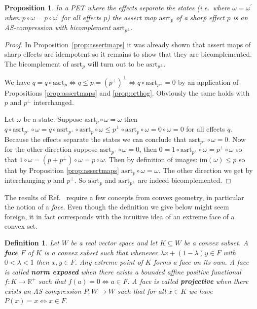 \documentclass[b5paper,onecolumn,12pt,accepted=2019-05-03, issue=1, volume=1, shorttitle=papers/compositionality-1-1]{compositionalityarticle}
\newcounter{counter}
\numberwithin{counter}{section}
\newtheorem{proposition}[counter]{Proposition}
\newtheorem{definition}[counter]{Definition}
\newcommand{\R}{\mathbb{R}}
\newcommand{\asrt}{\text{asrt}}
\newcommand{\im}[1]{\text{im}(#1)}
\begin{document}
\begin{proposition}\label{prop:gencompr}
    In a PET where the effects separate the states (i.e.\ where $\omega=\omega^\prime$ when $p\circ \omega = p\circ \omega^\prime$ for all effects $p$) the assert map $\asrt_p$ of a sharp effect $p$ is an AS-compression with bicomplement $\asrt_{p^\perp}$.
\end{proposition}
\begin{proof}
    In Proposition~\ref{prop:assertmaps} it was already shown that assert maps of sharp effects are idempotent so it remains to show that they are bicomplemented. The bicomplement of $\asrt_p$ will turn out to be $\asrt_{p^\perp}$.

    We have $q=q\circ \asrt_p \iff q\leq p=(p^\perp)^\perp \iff q\circ \asrt_{p^\perp}=0$ by an application of Propositions \ref{prop:assertmaps} and \ref{prop:orthog}. Obviously the same holds with $p$ and $p^\perp$ interchanged.

    Let $\omega$ be a state. Suppose $\asrt_p\circ \omega = \omega$ then $q\circ \asrt_{p^\perp}\circ \omega = q\circ\asrt_{p^\perp}\circ \asrt_p\circ\omega \leq p^\perp\circ \asrt_p\circ \omega = 0\circ\omega = 0$ for all effects $q$. Because the effects separate the states we can conclude that $\asrt_{p^\perp}\circ \omega = 0$. Now for the other direction suppose $\asrt_{p^\perp}\circ \omega = 0$, then $0=1\circ \asrt_{p^\perp}\circ \omega = p^\perp\circ \omega$ so that $1\circ \omega = (p+p^\perp)\circ \omega = p\circ \omega$. Then by definition of images: $\im{\omega}\leq p$ so that by Proposition \ref{prop:assertmaps} $\asrt_p\circ \omega = \omega$. The other direction we get by interchanging $p$ and $p^\perp$. So $\asrt_p$ and $\asrt_{p^\perp}$ are indeed bicomplemented.
\end{proof}

The results of Ref.~\cite{alfsen2012geometry} require a few concepts from convex geometry, in particular the notion of a \emph{face}. Even though the definition we give below might seem foreign, it in fact corresponds with the intuitive idea of an extreme face of a convex set.

\begin{definition}
    Let $W$ be a real vector space and let $K\subseteq W$ be a convex subset. A \textbf{face} $F$ of $K$ is a convex subset such that whenever $\lambda x + (1-\lambda) y\in F$ with $0<\lambda<1$ then $x, y \in F$. Any extreme point of $K$ forms a face on its own. A face is called \textbf{norm exposed} when there exists a bounded affine positive functional $f:K\rightarrow \R^+$ such that $f(a)=0\iff a\in F$. A face is called \textbf{projective} when there exists an AS-compression $P:W\rightarrow W$ such that for all $x\in K$ we have $P(x)=x \iff x\in F$.
\end{definition}
\end{document}
